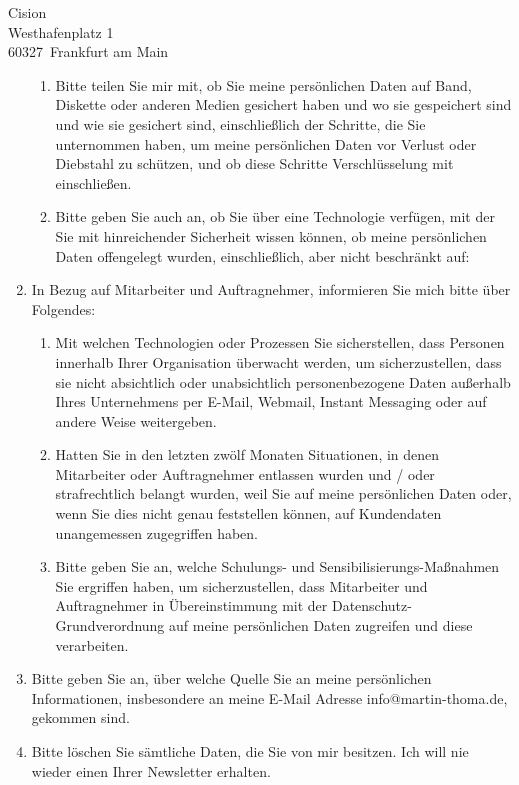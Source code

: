 \documentclass[a4paper, 12pt, KOMAold]{scrlttr2}
\makeatletter
\newcommand{\myEmail}{info@martin-thoma.de}    %
\newcommand{\Empfaenger}{Cision}            %
\newcommand{\EStrasse}{Westhafenplatz 1}    %
\newcommand{\EPLZ}{60327}                   %
\newcommand{\EOrt}{Frankfurt am Main}       %
\makeatother
\begin{document}
\begin{letter}{\Empfaenger \\ \EStrasse \\ \EPLZ~\EOrt}
\begin{enumerate}
\begin{enumerate}
    \item Bitte teilen Sie mir mit, ob Sie meine persönlichen Daten auf Band, Diskette oder anderen Medien gesichert haben und wo sie gespeichert sind und wie sie gesichert sind, einschließlich der Schritte, die Sie unternommen haben, um meine persönlichen Daten vor Verlust oder Diebstahl zu schützen, und ob diese Schritte Verschlüsselung mit einschließen.
    \item Bitte geben Sie auch an, ob Sie über eine Technologie verfügen, mit der Sie mit hinreichender Sicherheit wissen können, ob meine persönlichen Daten offengelegt wurden, einschließlich, aber nicht beschränkt auf:

\end{enumerate}
        \item In Bezug auf Mitarbeiter und Auftragnehmer, informieren Sie mich bitte über Folgendes:

\begin{enumerate}
    \item Mit welchen Technologien oder Prozessen Sie sicherstellen, dass Personen innerhalb Ihrer Organisation überwacht werden, um sicherzustellen, dass sie nicht absichtlich oder unabsichtlich personenbezogene Daten außerhalb Ihres Unternehmens per E-Mail, Webmail, Instant Messaging oder auf andere Weise weitergeben.
    \item Hatten Sie in den letzten zwölf Monaten Situationen, in denen Mitarbeiter oder Auftragnehmer entlassen wurden und / oder strafrechtlich belangt wurden, weil Sie auf meine persönlichen Daten oder, wenn Sie dies nicht genau feststellen können, auf Kundendaten unangemessen zugegriffen haben.
    \item Bitte geben Sie an, welche Schulungs- und Sensibilisierungs-Maßnahmen Sie ergriffen haben, um sicherzustellen, dass Mitarbeiter und Auftragnehmer in Übereinstimmung mit der Datenschutz-Grundverordnung auf meine persönlichen Daten zugreifen und diese verarbeiten.
\end{enumerate}
    \item Bitte geben Sie an, über welche Quelle Sie an meine persönlichen
    Informationen, insbesondere an meine E-Mail Adresse \myEmail, gekommen
    sind.
    \item Bitte löschen Sie sämtliche Daten, die Sie von mir besitzen. Ich will
          nie wieder einen Ihrer Newsletter erhalten.
    \end{enumerate}


\end{letter}
\end{document}
